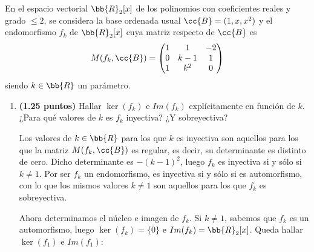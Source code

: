 \documentclass[12pt]{article}
\begin{document}
    \begin{ejercicio}[2.5 puntos]
        En el espacio vectorial $\bb{R}_2[x]$ de los polinomios con coeficientes reales y grado $\leq 2$, se considera la base ordenada usual $\cc{B}=(1,x,x^2)$ y el endomorfismo $f_k$ de $\bb{R}_2[x]$ cuya matriz respecto de $\cc{B}$ es 
        \begin{gather*}
            M(f_k, \cc{B}) = 
            \begin{pmatrix}
                1 & 1 & -2 \\
                0 & k-1 & 1 \\
                1 & k^2 & 0 \\
            \end{pmatrix}
        \end{gather*}
        siendo $k\in \bb{R}$ un parámetro.
        \begin{enumerate}
            \item \textbf{(1.25 puntos)} Hallar $\ker(f_k)$ e $Im(f_k)$ explícitamente en función de $k$. ¿Para qué valores de $k$ es $f_k$ inyectiva? ¿Y sobreyectiva?
            
            Los valores de $k\in \bb{R}$ para los que $k$ es inyectiva son aquellos para los que la matriz $M(f_k, \cc{B})$ es regular, es decir, su determinante es distinto de cero. Dicho determinante es $-(k-1)^2$, luego $f_k$ es inyectiva si y sólo si $k\neq 1$. Por ser $f_k$ un endomorfismo, es inyectiva si y sólo si es automorfismo, con lo que los mismos valores $k \neq 1$ son aquellos para los que $f_k$ es sobreyectiva.

            Ahora determinamos el núcleo e imagen de $f_k$. Si $k\neq 1$, sabemos que $f_k$ es un automorfismo, luego $\ker(f_k) = \{0\}$ e $Im(f_k) = \bb{R}_2[x]$. Queda hallar $\ker(f_1)$ e $Im(f_1)$:


\end{enumerate}
\end{ejercicio}
\end{document}
